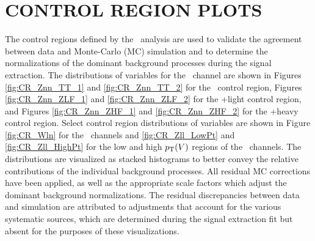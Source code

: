 \chapter{CONTROL REGION PLOTS}
\label{appendixB}

The control regions defined by the \VHbb\ analysis are used to validate the agreement between data and Monte-Carlo (MC) simulation and to determine the normalizations of the dominant background processes during the signal extraction. The distributions of variables for the \ZnnH\ channel are shown in Figures \ref{fig:CR_Znn_TT_1} and \ref{fig:CR_Znn_TT_2} for the \qrkt\qrktbar\ control region, Figures \ref{fig:CR_Znn_ZLF_1} and \ref{fig:CR_Znn_ZLF_2} for the \bosZ+light control region, and Figures \ref{fig:CR_Znn_ZHF_1} and \ref{fig:CR_Znn_ZHF_2} for the \bosZ+heavy control region. Select control region distributions of variables are shown in Figure \ref{fig:CR_Wln} for the \WlnH\ channels and \ref{fig:CR_Zll_LowPt} and \ref{fig:CR_Zll_HighPt} for the low and high $p_{\mathrm{T}}(V)$ regions of the \ZllH\ channels. The distributions are visualized as stacked histograms to better convey the relative contributions of the individual background processes. All residual MC corrections have been applied, as well as the appropriate scale factors which adjust the dominant background normalizations. The residual discrepancies between data and simulation are attributed to adjustments that account for the various systematic sources, which are determined during the signal extraction fit but absent for the purposes of these visualizations.



